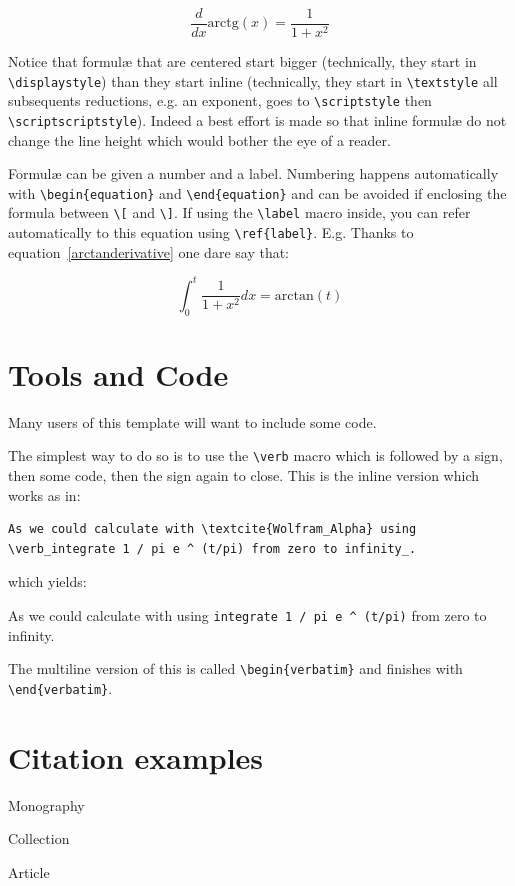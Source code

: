 \begin{equation}  \frac{d}{dx}\mbox{arctg}(x) = \frac{1}{1+x^2} \label{arctanderivative}\end{equation}

Notice that formulæ that are centered start bigger (technically, they start in \verb+\displaystyle+) than they start inline (technically, they start in \verb+\textstyle+ all subsequents reductions, e.g. an exponent, goes to \verb+\scriptstyle+ then \verb+\scriptscriptstyle+). Indeed a best effort is made so that inline formulæ do not change the line height which would bother the eye of a reader.

Formulæ can be given a number and a label. Numbering happens automatically with \verb+\begin{equation}+ and \verb+\end{equation}+ and can be avoided if enclosing the formula between \verb+\[+ and \verb+\]+. If using the \verb+\label+ macro inside, you can refer automatically to this equation using \verb+\ref{label}+. E.g. Thanks to equation~\ref{arctanderivative} one dare say that:

\begin{equation} \int_0^t \frac{1}{1+x^2} dx = \mbox{arctan}(t) \end{equation}


\section{Tools and Code}

Many users of this template will want to include some code.

The simplest way to do so is to use the \verb+\verb+ macro which is followed by a sign, then some code, then the sign again to close. This is the inline version which works as in: 


\begin{verbatim}
As we could calculate with \textcite{Wolfram_Alpha} using 
\verb_integrate 1 / pi e ^ (t/pi) from zero to infinity_.
\end{verbatim}

which yields: 

As we could calculate with \textcite{Wolfram_Alpha} using \verb_integrate 1 / pi e ^ (t/pi)_ from zero to infinity.


The multiline version of this is called \verb+\begin{verbatim}+ and finishes with \verb+\end{verbatim}+.


\section{Citation examples}

Monography \parencite[p.~22]{con:infra} 

Collection \parencite{sammelband} 

Article \parencite{article1}
